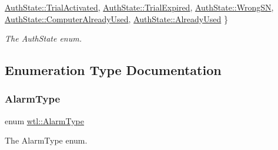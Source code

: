 \begin{DoxyCompactItemize}
\hyperlink{namespacewtl_a74cc3b258b8e82a1d6e032fb4c937353a730c990e1c0a0de56e8e585ca39a0507}{Auth\+State\+::\+Trial\+Activated}, 
\hyperlink{namespacewtl_a74cc3b258b8e82a1d6e032fb4c937353a9ba3b2c1b6c8dd283441e24d57de2ff1}{Auth\+State\+::\+Trial\+Expired}, 
\newline
\hyperlink{namespacewtl_a74cc3b258b8e82a1d6e032fb4c937353a4b67295ac0ca4e0ea63187216facf96f}{Auth\+State\+::\+Wrong\+SN}, 
\hyperlink{namespacewtl_a74cc3b258b8e82a1d6e032fb4c937353ae5c0ce39a0cba9b94c5cf56c29483734}{Auth\+State\+::\+Computer\+Already\+Used}, 
\hyperlink{namespacewtl_a74cc3b258b8e82a1d6e032fb4c937353a398fd509996a85a546d9214e526c2e62}{Auth\+State\+::\+Already\+Used}
 \}\begin{DoxyCompactList}\small\item\em The Auth\+State enum. \end{DoxyCompactList}
\end{DoxyCompactItemize}


\subsection{Enumeration Type Documentation}
\mbox{\label{namespacewtl_ac9fb2a665b6cd51719a16aba276874f2}} 
\subsubsection{\texorpdfstring{Alarm\+Type}{AlarmType}}
{\footnotesize\ttfamily enum \hyperlink{namespacewtl_ac9fb2a665b6cd51719a16aba276874f2}{wtl\+::\+Alarm\+Type}\hspace{0.3cm}{\ttfamily [strong]}}



The Alarm\+Type enum. 


